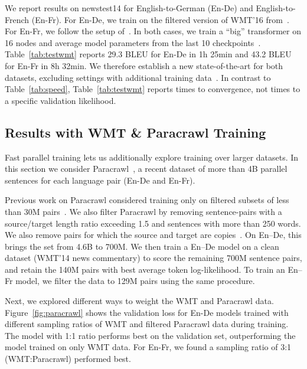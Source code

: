 \documentclass[11pt,a4paper]{article}
\begin{document}
We report results on newstest14 for English-to-German (En-De) and English-to-French (En-Fr).
For En-De, we train on the filtered version of WMT'16 from~\citet{vaswani2017transformer}.
For En-Fr, we follow the setup of~\citet{gehring2017convs2s}.
In both cases, we train a ``big'' transformer on 16 nodes and average model parameters from the last 10 checkpoints~\citep{vaswani2017transformer}.
Table~\ref{tab:testwmt} reports 29.3 BLEU for En-De in 1h 25min and 43.2 BLEU for En-Fr in 8h 32min. We therefore establish a new state-of-the-art for both datasets, excluding settings with additional training data~\citep{deepl}. In contrast to Table~\ref{tab:speed}, Table~\ref{tab:testwmt} reports times to convergence, not times to a specific validation likelihood.

\subsection{Results with WMT \& Paracrawl Training}
\label{sec:paracrawl}

Fast parallel training lets us additionally explore training over larger datasets. In this section we consider Paracrawl~\citep{paracrawl}, a recent dataset of more than 4B parallel sentences for each language pair (En-De and En-Fr).

Previous work on Paracrawl considered training only on filtered subsets of less than 30M pairs~\cite{xu2017xipporah}. %
We also filter Paracrawl by removing sentence-pairs with a source/target length ratio exceeding 1.5 and sentences with more than 250 words. We also remove pairs for which the source and target are copies~\cite{ott:uncertainty:2018}. On En--De, this brings the set from 4.6B to 700M. We then train a En--De model on a clean dataset (WMT'14 news commentary) to score the remaining 700M sentence pairs, and retain the 140M pairs with best average token log-likelihood.
To train an En--Fr model, we filter the data to 129M pairs using the same procedure.

Next, we explored different ways to weight the WMT and Paracrawl data.
Figure~\ref{fig:paracrawl} shows the validation loss for En-De models trained with different sampling ratios of WMT and filtered Paracrawl data during training.
The model with 1:1 ratio performs best on the validation set, outperforming the model trained on only WMT data.
For En-Fr, we found a sampling ratio of 3:1 (WMT:Paracrawl) performed best.
\end{document}
